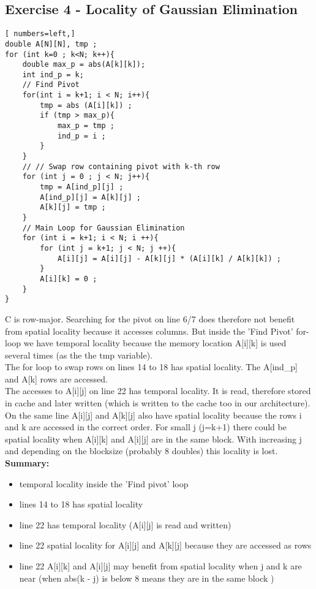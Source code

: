 \documentclass[10pt,a4paper,oneside,notitlepage]{report}
\begin{document}
\subsection*{Exercise 4 - Locality of Gaussian Elimination }

\begin{lstlisting}[ numbers=left,]
double A[N][N], tmp ;
for (int k=0 ; k<N; k++){
    double max_p = abs(A[k][k]);
    int ind_p = k;
    // Find Pivot
    for(int i = k+1; i < N; i++){
        tmp = abs (A[i][k]) ;
        if (tmp > max_p){
            max_p = tmp ;
            ind_p = i ;
        }
    }
    // // Swap row containing pivot with k-th row
    for (int j = 0 ; j < N; j++){
        tmp = A[ind_p][j] ;
        A[ind_p][j] = A[k][j] ;
        A[k][j] = tmp ;
    }
    // Main Loop for Gaussian Elimination
    for (int i = k+1; i < N; i ++){
        for (int j = k+1; j < N; j ++){
            A[i][j] = A[i][j] - A[k][j] * (A[i][k] / A[k][k]) ;
        }
        A[i][k] = 0 ;
    }
}
\end{lstlisting}

C is row-major. Searching for the pivot on line 6/7 does therefore not benefit from spatial locality because it accesses columns. But inside the 'Find Pivot' for-loop we have temporal locality because the memory location A[i][k] is used several times (as the the tmp variable). \\
The for loop to swap rows on lines 14 to 18 has spatial locality. The A[ind\_p] and A[k] rows are accessed. \\
The accesses to A[i][j] on line 22 has temporal locality. It is read, therefore stored in cache and later written (which is written to the cache too in our architecture). On the same line A[i][j] and A[k][j] also have spatial locality because the rows i and k are accessed in the correct order. For small j (j=k+1) there could be spatial locality when A[i][k] and A[i][j] are in the same block. With increasing j and depending on the blocksize (probably 8 doubles) this locality is lost. \\
\textbf{Summary:}
\begin{itemize}
\item temporal locality inside the 'Find pivot' loop
\item lines 14 to 18 has spatial locality
\item line 22 has temporal locality (A[i][j] is read and written)
\item line 22 spatial locality for A[i][j] and A[k][j] because they are accessed as rows
\item line 22 A[i][k] and A[i][j] may benefit from spatial locality when j and k are near (when abs(k - j) is below 8 means they are in the same block )
\end{itemize}
\end{document}
